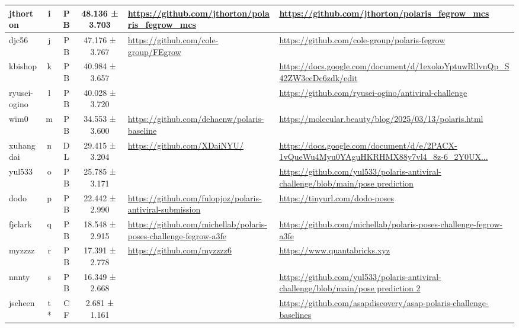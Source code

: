 \documentclass[journal=jcim,manuscript=suppinfo]{achemso}
\begin{document}
{\begin{longtable}{|p{2cm}|c|c|c|p{4cm}|p{6cm}|}
jthorton & i & PB & 48.136 ± 3.703 & \url{https://github.com/jthorton/polaris_fegrow_mcs} & \url{https://github.com/jthorton/polaris_fegrow_mcs} \\
\hline

djc56 & j & PB & 47.176 ± 3.767 & \url{https://github.com/cole-group/FEgrow} & \url{https://github.com/cole-group/polaris-fegrow} \\
\hline

kbishop & k & PB & 40.984 ± 3.657 &   & \url{https://docs.google.com/document/d/1exokoYptuwRllvnQp_S42ZW3ecDc6zdk/edit} \\
\hline

ryusei-ogino & l & PB & 40.028 ± 3.720 &   & \url{https://github.com/ryusei-ogino/antiviral-challenge} \\
\hline

wim0 & m & PB & 34.553 ± 3.600 & \url{https://github.com/dehaenw/polaris-baseline} & \url{https://molecular.beauty/blog/2025/03/13/polaris.html} \\
\hline

xuhangdai & n & DL & 29.415 ± 3.204 & \url{https://github.com/XDaiNYU/} & \url{https://docs.google.com/document/d/e/2PACX-1vQueWu4Myu0YAguHKRHMX88y7vl4_8z-6_2Y0UX...} \\
\hline

yul533 & o & PB & 25.785 ± 3.171 &   & \url{https://github.com/yul533/polaris-antiviral-challenge/blob/main/pose prediction} \\
\hline

dodo & p & PB & 22.442 ± 2.990 & \url{https://github.com/fulopjoz/polaris-antiviral-submission} & \url{https://tinyurl.com/dodo-poses} \\
\hline

fjclark & q & PB & 18.548 ± 2.915 & \url{https://github.com/michellab/polaris-poses-challenge-fegrow-a3fe} & \url{https://github.com/michellab/polaris-poses-challenge-fegrow-a3fe} \\
\hline

myzzzz & r & PB & 17.391 ± 2.778 & \url{https://github.com/myzzzz6} & \url{https://www.quantabricks.xyz} \\
\hline

nnnty & s & PB & 16.349 ± 2.668 &   & \url{https://github.com/yul533/polaris-antiviral-challenge/blob/main/pose prediction 2} \\
\hline

jscheen & t* & CF & 2.681 ± 1.161 &   & \url{https://github.com/asapdiscovery/asap-polaris-challenge-baselines} \\
\hline


\end{longtable}}
\end{document}
